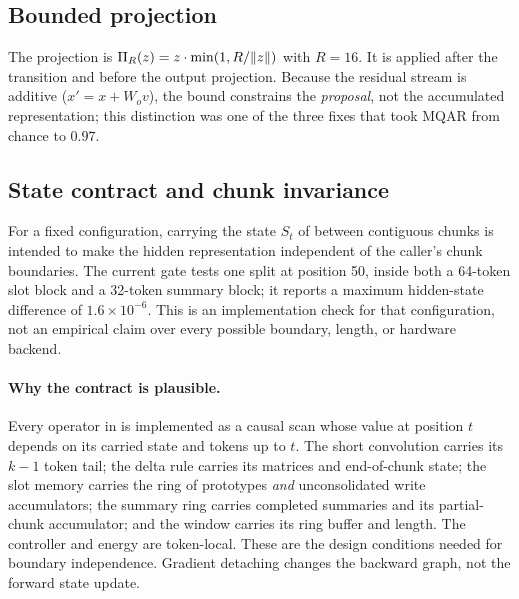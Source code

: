 \subsection{Bounded projection}

The projection is $\Pi_{R}(z)=z\cdot\min(1,R/\|z\|)$ with $R=16$. It is applied after the
transition and before the output projection. Because the residual stream is additive
($x'=x+W_ov$), the bound constrains the \emph{proposal}, not the accumulated representation;
this distinction was one of the three fixes that took MQAR from chance to $0.97$.

\subsection{State contract and chunk invariance}

\begin{observation}
\label{obs:chunk}
For a fixed configuration, carrying the state $S_t$ of  between contiguous
chunks is intended to make the hidden representation independent of the caller's chunk
boundaries. The current gate tests one split at position 50, inside both a 64-token slot block
and a 32-token summary block; it reports a maximum hidden-state difference of
$1.6\times10^{-6}$. This is an implementation check for that configuration, not an empirical
claim over every possible boundary, length, or hardware backend.
\end{observation}

\paragraph{Why the contract is plausible.}
Every operator in  is implemented as a causal scan whose value at position
$t$ depends on its carried state and tokens up to $t$. The short convolution carries its $k-1$
token tail; the delta rule carries its matrices and end-of-chunk state; the slot memory carries
the ring of prototypes \emph{and} unconsolidated write accumulators; the summary ring carries
completed summaries and its partial-chunk accumulator; and the window carries its ring buffer
and length. The controller and energy are token-local. These are the design conditions needed
for boundary independence. Gradient detaching changes the backward graph, not the forward
state update.

